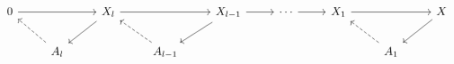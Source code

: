 \documentclass[12pt]{standalone}
\begin{document}
        $$

\begin{tikzcd}
 0 \ar[rr] & & X_l \ar[rr] \ar[dl] & & X_{l-1} \ar[r] \ar[dl] & \cdots \ar[r] & X_1 \ar[rr] & & X \ar[dl]  \\
 & \ar[ul,dashed] A_l & & \ar[ul,dashed] A_{l-1} & & & & \ar[ul,dashed] A_1 & 
\end{tikzcd}
        $$
        
\end{document}
